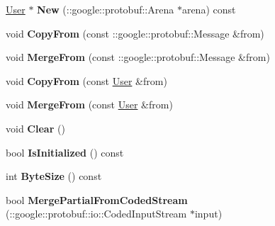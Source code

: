 \begin{DoxyCompactItemize}
\item 
\hypertarget{classSimpleChat_1_1User_ac6217a2abfe98ad2a6f2e15eee50d529}{\hyperlink{classSimpleChat_1_1User}{User} $\ast$ {\bfseries New} (\-::google\-::protobuf\-::\-Arena $\ast$arena) const }\label{classSimpleChat_1_1User_ac6217a2abfe98ad2a6f2e15eee50d529}

\item 
\hypertarget{classSimpleChat_1_1User_a867e04629c0c511b24a5da8c0449437c}{void {\bfseries Copy\-From} (const \-::google\-::protobuf\-::\-Message \&from)}\label{classSimpleChat_1_1User_a867e04629c0c511b24a5da8c0449437c}

\item 
\hypertarget{classSimpleChat_1_1User_aa98a5a27bfcb62c16a9481ad250b04e1}{void {\bfseries Merge\-From} (const \-::google\-::protobuf\-::\-Message \&from)}\label{classSimpleChat_1_1User_aa98a5a27bfcb62c16a9481ad250b04e1}

\item 
\hypertarget{classSimpleChat_1_1User_a0a68a82ad5773b1159f589ee7818473a}{void {\bfseries Copy\-From} (const \hyperlink{classSimpleChat_1_1User}{User} \&from)}\label{classSimpleChat_1_1User_a0a68a82ad5773b1159f589ee7818473a}

\item 
\hypertarget{classSimpleChat_1_1User_a4e808fbb7de9a513a82f4953f4570dab}{void {\bfseries Merge\-From} (const \hyperlink{classSimpleChat_1_1User}{User} \&from)}\label{classSimpleChat_1_1User_a4e808fbb7de9a513a82f4953f4570dab}

\item 
\hypertarget{classSimpleChat_1_1User_a9f4642144eddd10efeea8ebaff51ca65}{void {\bfseries Clear} ()}\label{classSimpleChat_1_1User_a9f4642144eddd10efeea8ebaff51ca65}

\item 
\hypertarget{classSimpleChat_1_1User_a8297129a543c5ca7b463c4ba4c068894}{bool {\bfseries Is\-Initialized} () const }\label{classSimpleChat_1_1User_a8297129a543c5ca7b463c4ba4c068894}

\item 
\hypertarget{classSimpleChat_1_1User_a43b778242ccd21d5d75bd4dc081be929}{int {\bfseries Byte\-Size} () const }\label{classSimpleChat_1_1User_a43b778242ccd21d5d75bd4dc081be929}

\item 
\hypertarget{classSimpleChat_1_1User_a4059958ebf9d50ce6acc096d61ff77b7}{bool {\bfseries Merge\-Partial\-From\-Coded\-Stream} (\-::google\-::protobuf\-::io\-::\-Coded\-Input\-Stream $\ast$input)}\label{classSimpleChat_1_1User_a4059958ebf9d50ce6acc096d61ff77b7}


\end{DoxyCompactItemize}
